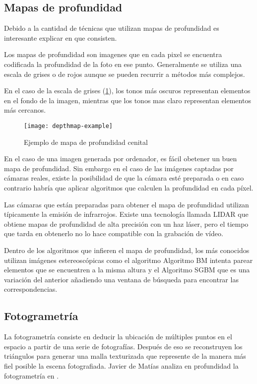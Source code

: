 \subsection{Mapas de profundidad}
Debido a la cantidad de técnicas que utilizan mapas de profundidad es interesante explicar en que consisten. 

Los mapas de profundidad son imagenes que en cada pixel se encuentra codificada la profundidad de la foto en ese punto. Generalmente se utiliza una escala de grises o de rojos aunque se pueden recurrir a métodos más complejos.\cite{Josh6DoFUnity}

En el caso de la escala de grises (\ref{fig:depthmap-example}), los tonos más oscuros representan elementos en el fondo de la imagen, mientras que los tonos mas claro representan elementos más cercanos.
\begin{figure}[h]
  \centering
  \texttt{[image: depthmap-example]}
  \caption{Ejemplo de mapa de profundidad cenital}
  \label{fig:depthmap-example}
\end{figure}

En el caso de una imagen generada por ordenador, es fácil obetener un buen mapa de profundidad. Sin embargo en el caso de las imágenes captadas por cámaras reales, existe la posibilidad de que la cámara esté preparada o en caso contrario habría que aplicar algoritmos que calculen la profundidad en cada píxel. 

Las cámaras que están preparadas para obtener el mapa de profundidad utilizan típicamente la emisión de infrarrojos. Existe una tecnología llamada LIDAR que obtiene mapas de profundidad de alta precisión con un haz láser, pero el tiempo que tarda en obtenerlo no lo hace compatible con la grabación de vídeo.

Dentro de los algoritmos que infieren el mapa de profundidad, los más conocidos utilizan imágenes estereoscópicas como el algoritmo Algoritmo BM  intenta parear elementos que se encuentren a la misma altura y el Algoritmo SGBM que es una variación del anterior añadiendo una ventana de búsqueda para encontrar las correspondencias.

\subsection{Fotogrametría}
La fotogrametría consiste en deducir la ubicación de múltiples puntos en el espacio a partir de una serie de fotografías. Después de eso se reconstruyen los triángulos para generar una malla texturizada que represente de la manera más fiel posible la escena fotografiada. Javier de Matías analiza en profundidad la fotogrametría en \cite{PhotogrametryThesis}.

